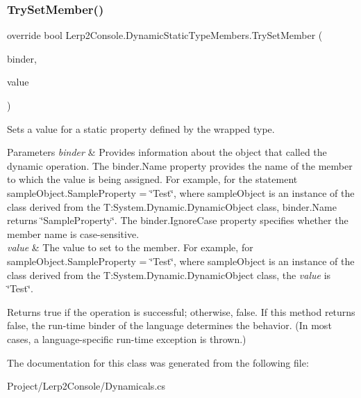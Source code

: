 \subsubsection{\texorpdfstring{Try\+Set\+Member()}{TrySetMember()}}
{\footnotesize\ttfamily override bool Lerp2\+Console.\+Dynamic\+Static\+Type\+Members.\+Try\+Set\+Member (\begin{DoxyParamCaption}\item[{Set\+Member\+Binder}]{binder,  }\item[{object}]{value }\end{DoxyParamCaption})\hspace{0.3cm}{\ttfamily [inline]}}



Sets a value for a static property defined by the wrapped type. 


\begin{DoxyParams}{Parameters}
{\em binder} & Provides information about the object that called the dynamic operation. The binder.\+Name property provides the name of the member to which the value is being assigned. For example, for the statement sample\+Object.\+Sample\+Property = \char`\"{}\+Test\char`\"{}, where sample\+Object is an instance of the class derived from the T\+:\+System.\+Dynamic.\+Dynamic\+Object class, binder.\+Name returns \char`\"{}\+Sample\+Property\char`\"{}. The binder.\+Ignore\+Case property specifies whether the member name is case-\/sensitive.\\
\hline
{\em value} & The value to set to the member. For example, for sample\+Object.\+Sample\+Property = \char`\"{}\+Test\char`\"{}, where sample\+Object is an instance of the class derived from the T\+:\+System.\+Dynamic.\+Dynamic\+Object class, the {\itshape value}  is \char`\"{}\+Test\char`\"{}.\\
\hline
\end{DoxyParams}
\begin{DoxyReturn}{Returns}
true if the operation is successful; otherwise, false. If this method returns false, the run-\/time binder of the language determines the behavior. (In most cases, a language-\/specific run-\/time exception is thrown.) 
\end{DoxyReturn}


The documentation for this class was generated from the following file\+:\begin{DoxyCompactItemize}
\item 
Project/\+Lerp2\+Console/Dynamicals.\+cs\end{DoxyCompactItemize}
